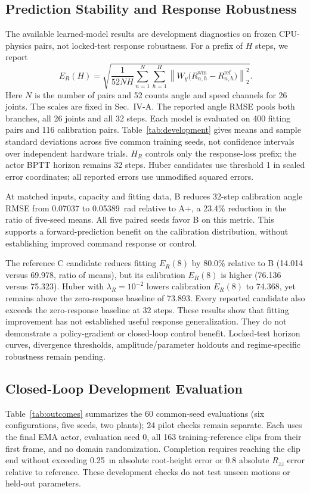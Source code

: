 \documentclass[letterpaper,10pt,conference]{ieeeconf}
\newcommand{\wm}{\mathrm{wm}}
\begin{document}
\subsection{Prediction Stability and Response Robustness}
The available learned-model results are development diagnostics on frozen CPU-physics pairs, not locked-test response robustness. For a prefix of $H$ steps, we report
\begin{equation}
 E_R(H)=\sqrt{\frac{1}{52NH}\sum_{n=1}^{N}\sum_{h=1}^{H}
 \left\|W_y\bigl(R_{n,h}^{\wm}-R_{n,h}^{\mathrm{ref}}\bigr)\right\|_2^2}.
\end{equation}
Here $N$ is the number of pairs and 52 counts angle and speed channels for 26 joints. The scales are fixed in Sec.~IV-A. The reported angle RMSE pools both branches, all 26 joints and all 32 steps. Each model is evaluated on 400 fitting pairs and 116 calibration pairs. Table~\ref{tab:development} gives means and sample standard deviations across five common training seeds, not confidence intervals over independent hardware trials. $H_R$ controls only the response-loss prefix; the actor BPTT horizon remains 32 steps. Huber candidates use threshold 1 in scaled error coordinates; all reported errors use unmodified squared errors.

At matched inputs, capacity and fitting data, B reduces 32-step calibration angle RMSE from 0.07037 to 0.05389~rad relative to A+, a 23.4\% reduction in the ratio of five-seed means. All five paired seeds favor B on this metric. This supports a forward-prediction benefit on the calibration distribution, without establishing improved command response or control.

The reference C candidate reduces fitting $E_R(8)$ by 80.0\% relative to B (14.014 versus 69.978, ratio of means), but its calibration $E_R(8)$ is higher (76.136 versus 75.323). Huber with $\lambda_R=10^{-2}$ lowers calibration $E_R(8)$ to 74.368, yet remains above the zero-response baseline of 73.893. Every reported candidate also exceeds the zero-response baseline at 32 steps. These results show that fitting improvement has not established useful response generalization. They do not demonstrate a policy-gradient or closed-loop control benefit. Locked-test horizon curves, divergence thresholds, amplitude/parameter holdouts and regime-specific robustness remain pending.

\subsection{Closed-Loop Development Evaluation}
Table~\ref{tab:outcomes} summarizes the 60 common-seed evaluations (six configurations, five seeds, two plants); 24 pilot checks remain separate. Each uses the final EMA actor, evaluation seed 0, all 163 training-reference clips from their first frame, and no domain randomization. Completion requires reaching the clip end without exceeding 0.25~m absolute root-height error or 0.8 absolute $R_{zz}$ error relative to reference. These development checks do not test unseen motions or held-out parameters.
\end{document}
